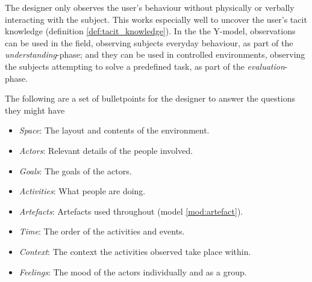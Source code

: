 \begin{method}[Observation] \label{meth:observation} 
  The designer only observes the user's behaviour without physically or verbally interacting with the subject. This works especially well to uncover the user's tacit knowledge (definition \ref{def:tacit_knowledge}). In the the Y-model, observations can be used in the field, observing subjects everyday behaviour, as part of the \emph{understanding}-phase; and they can be used in controlled environments, observing the subjects attempting to solve a predefined task, as part of the \emph{evaluation}-phase. \cite[p.247-248]{rogers}

  The following are a set of bulletpoints for the designer to answer the questions they might have \cite[p.249]{rogers}
  \begin{itemize}
    \item \emph{Space}: The layout and contents of the environment.
    \item \emph{Actors}: Relevant details of the people involved.
    \item \emph{Goals}: The goals of the actors.
    \item \emph{Activities}: What people are doing.
    \item \emph{Artefacts}: Artefacts used throughout (model \ref{mod:artefact}).
    \item \emph{Time}: The order of the activities and events.
    \item \emph{Context}: The context the activities observed take place within.
    \item \emph{Feelings}: The mood of the actors individually and as a group.
  \end{itemize}
\end{method}